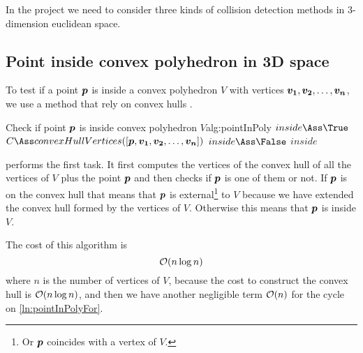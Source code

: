 \documentclass[dissertation.tex]{subfiles}
\begin{document}
In the project we need to consider three kinds of collision detection
methods in 3-dimension euclidean space.

\subsection{Point inside convex polyhedron in 3D space}
To test if a point $\boldsymbol{p}$ is inside a convex polyhedron $V$ with
vertices $\boldsymbol{v_1},\boldsymbol{v_2},\dots,\boldsymbol{v_n}$, we use a method that rely
on convex hulls \cite{deberg}\cite{schneider}.

\begin{algo}{Check if point $\boldsymbol{p}$ is inside convex polyhedron $V$}{alg:pointInPoly}
  \State $inside\Ass\True$
  \State $C\Ass convexHullVertices([\ve{p},\ve{v_1},\ve{v_2},\dots,\ve{v_n}])$
  \label{ln:pointInPolyFor}
  \State $inside\Ass\False$
  \State \Break
  \EndIf
  \EndFor
  \State\Return $inside$
  \EndFunction
\end{algo}
 performs the first task. It first
computes the vertices of the convex hull of all
the vertices of $V$ plus the point $\boldsymbol{p}$ and then checks if
$\boldsymbol{p}$ is one 
of them or not. If $\boldsymbol{p}$ is on the convex hull that
means that $\boldsymbol{p}$ is external\footnote{Or $\boldsymbol{p}$ coincides with a
  vertex of $V$.} to $V$ because we have extended the convex hull
formed by the vertices of $V$. Otherwise this means that $\boldsymbol{p}$ is
inside $V$.

The cost of this algorithm is
\begin{equation*}
  \mathcal{O}(n\log n)
\end{equation*}
where $n$ is the number of vertices of $V$, because the cost to 
construct the convex hull is \cite{deberg} $\mathcal{O}(n\log n)$, and
then we have another negligible term $\mathcal{O}(n)$ for the cycle on
\cref{ln:pointInPolyFor}.
\end{document}
